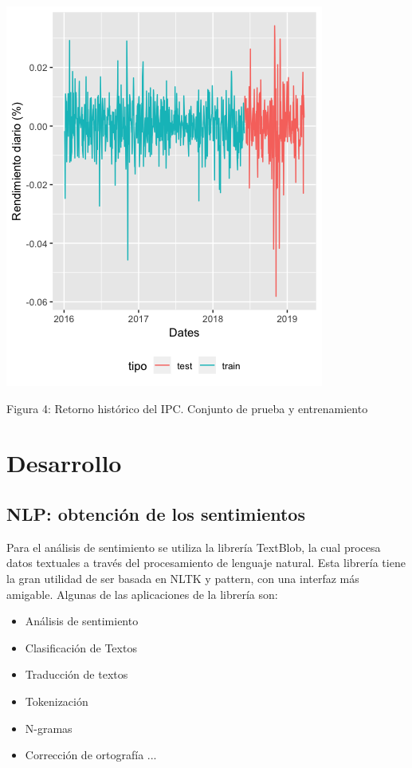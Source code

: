 \documentclass[12pt,reqno,letter]{article}
\newenvironment{fig2}[1][\unskip]{}{} %
\begin{document}
\begin{multicols}{2}
\begin{fig2}
\includegraphics[scale=0.5]{img/IPC_hist.png}
\caption{Figura 4: Retorno histórico del IPC. Conjunto de prueba y entrenamiento}
\end{fig2}

		
\section{Desarrollo}

\subsection{NLP: obtención de los sentimientos}

    Para el análisis de sentimiento se utiliza la librería TextBlob, la cual procesa datos textuales a través del procesamiento de lenguaje natural. Esta librería tiene la gran utilidad de ser basada en NLTK y pattern, con una interfaz más amigable. Algunas de las aplicaciones de la librería son: 
    
    \begin{itemize}
    \item Análisis de sentimiento
    \item Clasificación de Textos
    \item Traducción de textos
    \item Tokenización
    \item N-gramas
    \item Corrección de ortografía ...
    \end{itemize}


\end{multicols}
\end{document}

